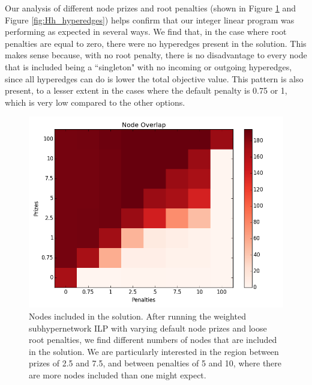\documentclass[12pt,twoside]{reedthesis}
\theoremstyle{definition}
\begin{document}
   Our analysis of different node prizes and root penalties (shown in Figure \ref{fig:Hh_nodes} and Figure \ref{fig:Hh_hyperedges}) helps confirm that our integer linear program was performing as expected in several ways. We find that, in the case where root penalties are equal to zero, there were no hyperedges present in the solution. This makes sense because, with no root penalty, there is no disadvantage to every node that is included being a ``singleton" with no incoming or outgoing hyperedges, since all hyperedges can do is lower the total objective value. This pattern is also present, to a lesser extent in the cases where the default penalty is 0.75 or 1, which is very low compared to the other options. \par

   \begin{figure}
     \centering
     \includegraphics[width=0.8\linewidth]{Hh_nodes}
     \caption[Nodes included in the solution.]{Nodes included in the solution. After running the weighted subhypernetwork ILP with varying default node prizes and loose root penalties, we find different numbers of nodes that are included in the solution. We are particularly interested in the region between prizes of 2.5 and 7.5, and between penalties of 5 and 10, where there are more nodes included than one might expect.}
     \label{fig:Hh_nodes}
   \end{figure}%
\end{document}
